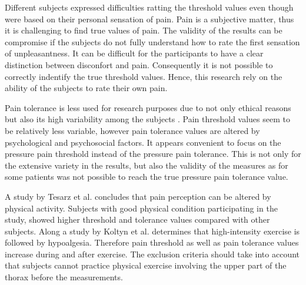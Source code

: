 Different subjects expressed difficulties ratting the threshold values even though were based on their personal sensation of pain. Pain is a subjective matter, thus it is challenging to find true values of pain. The validity of the results can be compromise if the subjects do not fully understand how to rate the first sensation of unpleasantness. It can be difficult for the participants to have a clear distinction between disconfort and pain. Consequently it is not possible to correctly indentify the true threshold values. Hence, this research rely on the ability of the subjects to rate their own pain. 

Pain tolerance is less used for research purposes due to not only  ethical reasons but also its high variability among the subjects \cite{Yarnitsky2006}. Pain threshold values seem to be relatively less variable, however pain tolerance values are altered by psychological and psychosocial factors. It appears convenient to focus on the pressure pain threshold instead of the pressure pain tolerance. This is not only for the extensive variety in the results, but also the validity of the measures as for some patients was not possible to reach the true pressure pain tolerance value.

A study by Tesarz et al. \cite{Tesarz2012} concludes that pain perception can be altered by physical activity. Subjects with good physical condition participating in the study, showed higher threshold and tolerance values compared with other subjects.
Along a study by Koltyn et al. \cite{Koltyn2002} determines that high-intensity exercise is followed by hypoalgesia. Therefore pain threshold as well as pain tolerance values increase during and after exercise. The exclusion criteria should take into account that subjects cannot practice physical exercise involving the upper part of the thorax before the measurements.

